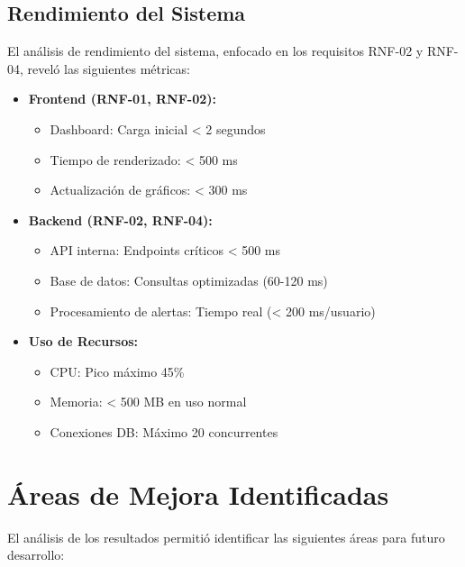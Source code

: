 \subsection{Rendimiento del Sistema}
El análisis de rendimiento del sistema, enfocado en los requisitos RNF-02 y RNF-04, reveló las siguientes métricas:
\begin{itemize}
    \item \textbf{Frontend (RNF-01, RNF-02):}
        \begin{itemize}
            \item Dashboard: Carga inicial < 2 segundos
            \item Tiempo de renderizado: < 500 ms
            \item Actualización de gráficos: < 300 ms
        \end{itemize}
    \item \textbf{Backend (RNF-02, RNF-04):}
        \begin{itemize}
            \item API interna: Endpoints críticos < 500 ms
            \item Base de datos: Consultas optimizadas (60-120 ms)
            \item Procesamiento de alertas: Tiempo real (< 200 ms/usuario)
        \end{itemize}
    \item \textbf{Uso de Recursos:}
        \begin{itemize}
            \item CPU: Pico máximo 45\%
            \item Memoria: < 500 MB en uso normal
            \item Conexiones DB: Máximo 20 concurrentes
        \end{itemize}
\end{itemize}

\section{Áreas de Mejora Identificadas}
\label{sec:areas_mejora}

El análisis de los resultados permitió identificar las siguientes áreas para futuro desarrollo:

